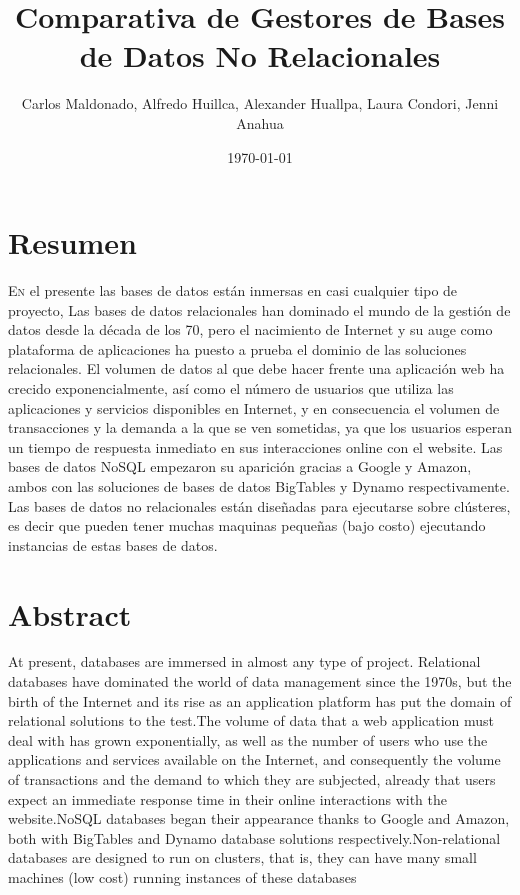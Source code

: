 \documentclass[twoside,twocolumn]{article}
\title{Comparativa de Gestores de Bases de Datos No Relacionales} %
\author{Carlos Maldonado, Alfredo Huillca, Alexander Huallpa, Laura Condori, Jenni Anahua}
\date{\today} %
\begin{document}
\maketitle


\section{Resumen}

\lettrine[nindent=0em,lines=3]{E}n el presente las bases de datos están inmersas en casi cualquier tipo de proyecto, Las bases de datos relacionales han dominado el mundo de la gestión de datos desde la década de los 70, pero el nacimiento de Internet y su auge como plataforma de aplicaciones ha puesto a prueba el dominio de las soluciones relacionales.
El volumen de datos al que debe hacer frente una aplicación web ha crecido exponencialmente, así como el número de usuarios que utiliza las aplicaciones y servicios disponibles en Internet, y en consecuencia el volumen de transacciones y la demanda a la que se ven sometidas, ya que los usuarios esperan un tiempo de respuesta inmediato en sus interacciones online con el website.
Las bases de datos NoSQL empezaron su aparición gracias a Google y Amazon, ambos con las soluciones de bases de datos BigTables y Dynamo respectivamente.
Las bases de datos no relacionales están diseñadas para ejecutarse sobre clústeres, es decir que pueden tener muchas maquinas pequeñas (bajo costo) ejecutando instancias de estas bases de datos.





\section{Abstract}


At present, databases are immersed in almost any type of project. 
Relational databases have dominated the world of data management since the 1970s,
but the birth of the Internet and its rise as an application platform has put 
the domain of relational solutions to the test.The volume of data that a web
application must deal with has grown exponentially, as well as the number of 
users who use the applications and services available on the Internet, and 
consequently the volume of transactions and the demand to which they are subjected,
already that users expect an immediate response time in their online interactions
with the website.NoSQL databases began their appearance thanks to Google and 
Amazon, both with BigTables and Dynamo database solutions
respectively.Non-relational databases are designed to run on clusters, that is,
they can have many small machines (low cost) running instances of these databases
\end{document}

